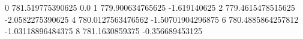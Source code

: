 0 781.519775390625 0.0
1 779.900634765625 -1.619140625
2 779.4615478515625 -2.0582275390625
4 780.0127563476562 -1.50701904296875
6 780.4885864257812 -1.03118896484375
8 781.1630859375 -0.356689453125
